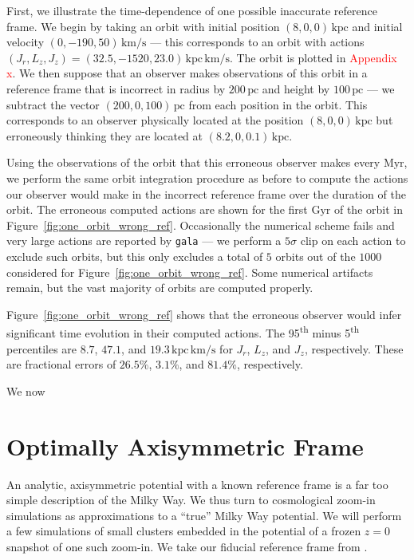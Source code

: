 \documentclass[twocolumn]{aastex62}
\newcommand{\Gus}[1]{\textcolor{red}{#1}}
\newcommand{\pc}{\text{pc}}
\newcommand{\kpc}{\text{kpc}}
\newcommand{\Myr}{\text{Myr}}
\newcommand{\Gyr}{\text{Gyr}}
\newcommand{\kms}{\text{km}/\text{s}}
\newcommand{\actunit}{\text{kpc}\,\kms}
\newcommand{\z}{z}
\begin{document}
First, we illustrate the time-dependence of one possible inaccurate reference
frame. We begin by taking an orbit with initial position $(8, 0, 0)\,\kpc$ and
initial velocity $(0, -190, 50)\,\kms$ --- this corresponds to an orbit with
actions $(J_r, L_z, J_z) = (32.5, -1520, 23.0)\,\actunit$. The orbit is
plotted in \Gus{Appendix x}. We then suppose that an observer makes
observations of this orbit in a reference frame that is incorrect in radius by
$200\,\pc$ and height by $100\,\pc$ --- we subtract the vector $(200, 0,
100)\,\pc$ from each position in the orbit. This corresponds to an observer
physically located at the position $(8, 0, 0)\,\kpc$ but erroneously thinking
they are located at $(8.2, 0, 0.1)\,\kpc$.

Using the observations of the orbit that this erroneous observer makes every
$\Myr$, we perform the same orbit integration procedure as before to compute
the actions our observer would make in the incorrect reference frame over the
duration of the orbit. The erroneous computed actions are shown for the first
$\Gyr$ of the orbit in Figure~\ref{fig:one_orbit_wrong_ref}. Occasionally the
numerical scheme fails and very large actions are reported by \texttt{gala}
--- we perform a $5\sigma$ clip on each action to exclude such orbits, but
this only excludes a total of $5$ orbits out of the $1000$ considered for
Figure~\ref{fig:one_orbit_wrong_ref}. Some numerical artifacts remain, but the
vast majority of orbits are computed properly.

Figure~\ref{fig:one_orbit_wrong_ref} shows that the erroneous observer would
infer significant time evolution in their computed actions. The
95\textsuperscript{th} minus 5\textsuperscript{th} percentiles are $8.7$,
$47.1$, and $19.3\,\actunit$ for $J_r$, $L_z$, and $J_z$, respectively. These
are fractional errors of $26.5\%$, $3.1\%$, and $81.4\%$, respectively.

\begin{figure*}
\caption{Caption.}
\label{fig:one_orbit_wrong_ref}
\end{figure*}

We now 

\section{Optimally Axisymmetric Frame} \label{sec:oa_frame}
An analytic, axisymmetric potential with a known reference frame is a far too
simple description of the Milky Way. We thus turn to cosmological zoom-in
simulations as approximations to a ``true'' Milky Way potential. We will
perform a few simulations of small clusters embedded in the potential of a
frozen $\z=0$ snapshot of one such zoom-in. We take our fiducial reference
frame from \citet{2018arXiv180610564S}.
\end{document}
